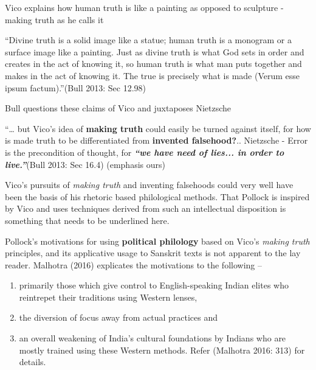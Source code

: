 Vico explains how human truth is like a painting as opposed to sculpture - making truth as he calls it

\begin{myquote}
“Divine truth is a solid image like a statue; human truth is a monogram or a surface image like a painting. Just as divine truth is what God sets in order and creates in the act of knowing it, so human truth is what man puts together and makes in the act of knowing it. The true is precisely what is made (Verum esse ipsum factum).”\hfill (Bull 2013: Sec 12.98)
\end{myquote}

Bull questions these claims of Vico and juxtaposes Nietzsche

\begin{myquote}
“… but Vico’s idea of \textbf{making truth} could easily be turned against itself, for how is made truth to be differentiated from \textbf{invented falsehood?}.. Nietzsche - Error is the precondition of thought, for \textbf{\textit{“we have need of lies... in order to live.”}}\hfill (Bull 2013: Sec 16.4) (emphasis ours)
\end{myquote}

Vico’s pursuits of \textit{making truth} and inventing falsehoods could very well have been the basis of his rhetoric based philological methods. That Pollock is inspired by Vico and uses techniques derived from such an intellectual disposition is something that needs to be underlined here.

Pollock’s motivations for using \textbf{political philology} based on Vico’s \textit{making truth} principles, and its applicative usage to Sanskrit texts is not apparent to the lay reader. Malhotra (2016) explicates the motivations to the following –

\begin{enumerate}
\itemsep=0pt
\item primarily those which give control to English-speaking Indian elites who reintrepet their traditions using Western lenses,

 \item the diversion of focus away from actual practices and

 \item an overall weakening of India’s cultural foundations by Indians who are mostly trained using these Western methods. Refer (Malhotra 2016: 313) for details.

\end{enumerate}

